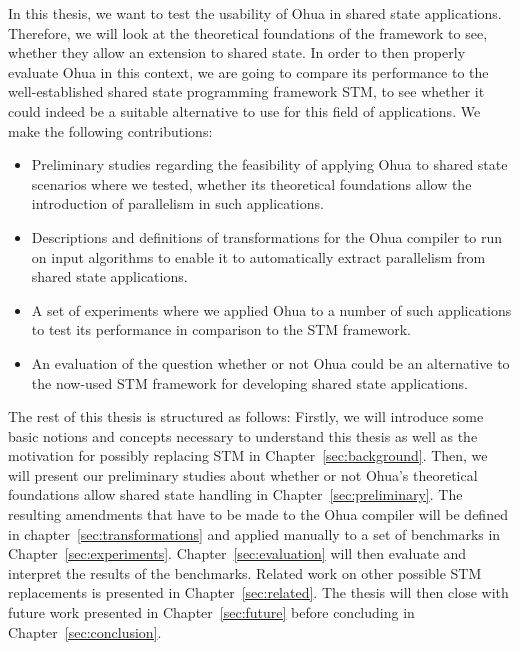 In this thesis, we want to test the usability of Ohua in shared state applications.
Therefore, we will look at the theoretical foundations of the framework to see, whether they allow an extension to shared state.
In order to then properly evaluate Ohua in this context, we are going to compare its performance to the well-established shared state programming framework STM, to see whether it could indeed be a suitable alternative to use for this field of applications.
We make the following contributions:

\begin{itemize}
    \item Preliminary studies regarding the feasibility of applying Ohua to shared state scenarios where we tested, whether its theoretical foundations allow the introduction of parallelism in such applications.
    \item Descriptions and definitions of transformations for the Ohua compiler to run on input algorithms to enable it to automatically extract parallelism from shared state applications.
    \item A set of experiments where we applied Ohua to a number of such applications to test its performance in comparison to the STM framework.
    \item An evaluation of the question whether or not Ohua could be an alternative to the now-used STM framework for developing shared state applications.
\end{itemize}

The rest of this thesis is structured as follows:
Firstly, we will introduce some basic notions and concepts necessary to understand this thesis as well as the motivation for possibly replacing STM in Chapter~\ref{sec:background}.
Then, we will present our preliminary studies about whether or not Ohua's theoretical foundations allow shared state handling in Chapter~\ref{sec:preliminary}.
The resulting amendments that have to be made to the Ohua compiler will be defined in chapter~\ref{sec:transformations} and applied manually to a set of benchmarks in Chapter~\ref{sec:experiments}.
Chapter~\ref{sec:evaluation} will then evaluate and interpret the results of the benchmarks.
Related work on other possible STM replacements is presented in Chapter~\ref{sec:related}.
The thesis will then close with future work presented in Chapter~\ref{sec:future} before concluding in Chapter~\ref{sec:conclusion}.
